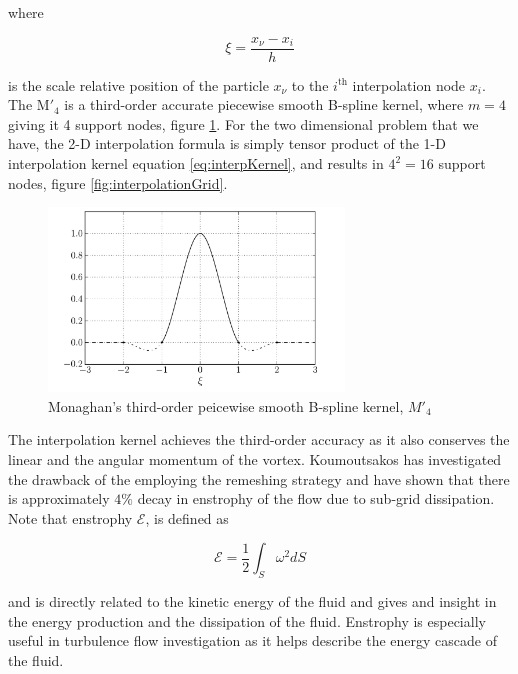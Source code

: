 where 

	\begin{equation}
	\xi = \frac{x_{\nu} - x_i}{h}
	\label{eq:xiEquation}
	\end{equation}

is the scale relative position of the particle $x_{\nu}$ to the $i^{\mathrm{th}}$ interpolation node $x_i$. The $\mathrm{M'}_4$ is a third-order accurate piecewise smooth B-spline kernel, where $m = 4$ giving it 4 support nodes, figure \ref{fig:interpolationKernel}. For the two dimensional problem that we have, the 2-D interpolation formula is simply tensor product of the 1-D interpolation kernel equation \ref{eq:interpKernel}, and results in $4^2 = 16$ support nodes, figure \ref{fig:interpolationGrid}.

	\begin{figure}[t]
	\centering
	\includegraphics[width=0.7\textwidth]{figures/lagrangian/interpolationKernel.pdf}
	\caption{Monaghan's \cite{Monaghan1985} third-order peicewise smooth B-spline kernel, $M'_4$}
	\label{fig:interpolationKernel}
	\end{figure}

The interpolation kernel achieves the third-order accuracy as it also conserves the linear and the angular momentum of the vortex. Koumoutsakos \cite{Koumoutsakos1997} has investigated the drawback of the employing the remeshing strategy and have shown that there is approximately $4\%$ decay in enstrophy of the flow due to sub-grid dissipation. Note that enstrophy $ \mathcal{E}$, is defined as

	\begin{equation}
	\mathcal{E} = \frac{1}{2}\int_S \omega^2 dS
	\end{equation}
	
and is directly related to the kinetic energy of the fluid and gives and insight in the energy production and the dissipation of the fluid. Enstrophy is especially useful in turbulence flow investigation as it helps describe the energy cascade of the fluid.		

